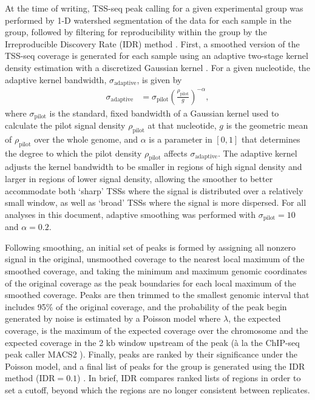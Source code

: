 At the time of writing, TSS-seq peak calling for a given experimental group was performed by 1-D watershed segmentation of the data for each sample in the group, followed by filtering for reproducibility within the group by the Irreproducible Discovery Rate (IDR) method \citep{li2011}.
First, a smoothed version of the TSS-seq coverage is generated for each sample using an adaptive two-stage kernel density estimation with a discretized Gaussian kernel \citep{silverman1986}.
For a given nucleotide, the adaptive kernel bandwidth, $\sigma_{\text{adaptive}}$, is given by
\begin{align*}
    \sigma_{\text{adaptive}} &= \sigma_\text{pilot} \left( \frac{\rho_{\text{pilot}}}{g} \right)^{-\alpha},
\end{align*}
where $\sigma_\text{pilot}$ is the standard, fixed bandwidth of a Gaussian kernel used to calculate the pilot signal density $\rho_\text{pilot}$ at that nucleotide, $g$ is the geometric mean of $\rho_\text{pilot}$ over the whole genome, and $\alpha$ is a parameter in $[0,1]$ that determines the degree to which the pilot density $\rho_\text{pilot}$ affects $\sigma_\text{adaptive}$.
The adaptive kernel adjusts the kernel bandwidth to be smaller in regions of high signal density and larger in regions of lower signal density, allowing the smoother to better accommodate both `sharp' TSSs where the signal is distributed over a relatively small window, as well as `broad' TSSs where the signal is more dispersed.
For all analyses in this document, adaptive smoothing was performed with $\sigma_\text{pilot} = 10$ and $\alpha = 0.2$.

Following smoothing, an initial set of peaks is formed by assigning all nonzero signal in the original, unsmoothed coverage to the nearest local maximum of the smoothed coverage, and taking the minimum and maximum genomic coordinates of the original coverage as the peak boundaries for each local maximum of the smoothed coverage.
Peaks are then trimmed to the smallest genomic interval that includes 95\% of the original coverage, and the probability of the peak begin generated by noise is estimated by a Poisson model where $\lambda$, the expected coverage, is the maximum of the expected coverage over the chromosome and the expected coverage in the 2 kb window upstream of the peak (\`a la the ChIP-seq peak caller MACS2 \citep{zhang2008}).
Finally, peaks are ranked by their significance under the Poisson model, and a final list of peaks for the group is generated using the IDR method ($\text{IDR}=0.1$) \citep{li2011}.
In brief, IDR compares ranked lists of regions in order to set a cutoff, beyond which the regions are no longer consistent between replicates.

